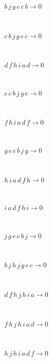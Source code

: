 \begin{minipage}{6in}
$
b\,
 j\,
 g\,
 e\,
 c\,
 b\rightarrow 0
$
\end{minipage}\medskip \\
\begin{minipage}{6in}
$
c\,
 b\,
 j\,
 g\,
 e\,
 c\rightarrow 0
$
\end{minipage}\medskip \\
\begin{minipage}{6in}
$
d\,
 f\,
 h\,
 i\,
 a\,
 d\rightarrow 0
$
\end{minipage}\medskip \\
\begin{minipage}{6in}
$
e\,
 c\,
 b\,
 j\,
 g\,
 e\rightarrow 0
$
\end{minipage}\medskip \\
\begin{minipage}{6in}
$
f\,
 h\,
 i\,
 a\,
 d\,
 f\rightarrow 0
$
\end{minipage}\medskip \\
\begin{minipage}{6in}
$
g\,
 e\,
 c\,
 b\,
 j\,
 g\rightarrow 0
$
\end{minipage}\medskip \\
\begin{minipage}{6in}
$
h\,
 i\,
 a\,
 d\,
 f\,
 h\rightarrow 0
$
\end{minipage}\medskip \\
\begin{minipage}{6in}
$
i\,
 a\,
 d\,
 f\,
 h\,
 i\rightarrow 0
$
\end{minipage}\medskip \\
\begin{minipage}{6in}
$
j\,
 g\,
 e\,
 c\,
 b\,
 j\rightarrow 0
$
\end{minipage}\medskip \\
\begin{minipage}{6in}
$
b\,
 j\,
 h\,
 j\,
 g\,
 e\,
 c\rightarrow 0
$
\end{minipage}\medskip \\
\begin{minipage}{6in}
$
d\,
 f\,
 h\,
 j\,
 h\,
 i\,
 a\rightarrow 0
$
\end{minipage}\medskip \\
\begin{minipage}{6in}
$
f\,
 h\,
 j\,
 h\,
 i\,
 a\,
 d\rightarrow 0
$
\end{minipage}\medskip \\
\begin{minipage}{6in}
$
h\,
 j\,
 h\,
 i\,
 a\,
 d\,
 f\rightarrow 0
$
\end{minipage}\medskip \\
